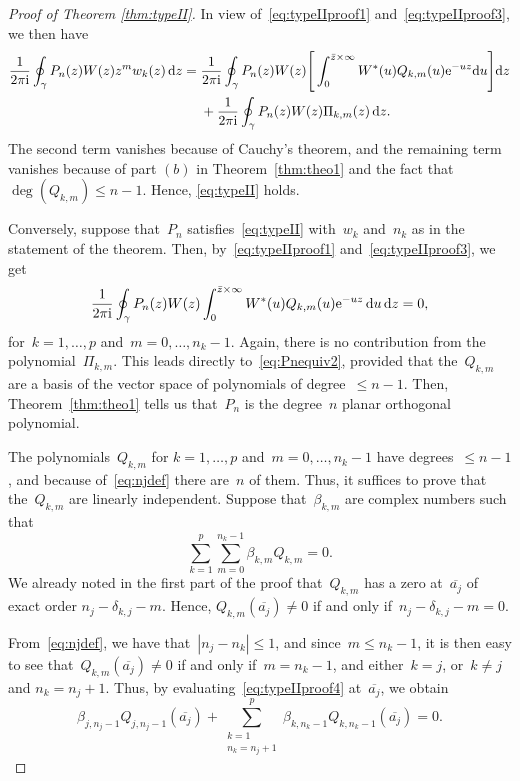 \documentclass[pdftex]{sigma}
\numberwithin{equation}{section}
\begin{document}
\begin{proof}[Proof of Theorem \ref{thm:typeII}]
 In view of~\eqref{eq:typeIIproof1} and~\eqref{eq:typeIIproof3}, we then have
 \begin{equation*}
 \begin{aligned}
 \frac{1}{2\pi {\rm i}} \oint_{\gamma} P_n(z) W(z) z^m w_k(z)\, {\rm d}z ={} &\frac{1}{2\pi {\rm i}} \oint_{\gamma} P_n(z) W(z) \Bigg[ \int_0^{\bar{z} \times \infty} W^*(u) Q_{k,m}(u) {\rm e}^{-uz} {\rm d}u\Bigg] {\rm d}z
 \\
 &{}+\frac{1}{2\pi {\rm i}} \oint_{\gamma} P_n(z) W(z)\Pi_{k,m}(z)\, {\rm d}z.
 \end{aligned}
 \end{equation*}
 The second term vanishes because of Cauchy's theorem, and the remaining term vanishes because of part $(b)$ in Theorem~\ref{thm:theo1} and the fact that~$\deg(Q_{k,m}) \leq n-1$. Hence, \eqref{eq:typeII} holds.

 Conversely, suppose that~$P_n$ satisfies~\eqref{eq:typeII} with~$w_k$ and~$n_k$ as in the statement of the theorem. Then, by~\eqref{eq:typeIIproof1} and~\eqref{eq:typeIIproof3}, we get
 \begin{equation*}
 \frac{1}{2\pi {\rm i}} \oint_{\gamma} P_n(z) W(z) \int_0^{\bar{z} \times \infty} W^*(u) Q_{k,m}(u) {\rm e}^{-uz}\, {\rm d}u\, {\rm d}z = 0,
 \end{equation*}
 for~$k=1, \dots, p$ and~$m = 0, \dots, n_k-1$. Again, there is no contribution from the polynomial~$\Pi_{k,m}$. This leads directly to~\eqref{eq:Pnequiv2}, provided that the~$Q_{k,m}$ are a basis of the vector space of polynomials of degree~$\leq n-1$. Then, Theorem~\ref{thm:theo1} tells us that~$P_n$ is the degree~$n$ planar orthogonal polynomial.

 The polynomials~$Q_{k,m}$ for $k=1, \dots, p$ and~$m=0, \dots, n_k-1$ have degrees~$\leq n-1$, and because of~\eqref{eq:njdef} there are~$n$ of them. Thus, it suffices to prove that the~$Q_{k,m}$ are linearly independent. Suppose that~$\beta_{k,m}$ are complex numbers such that
 \begin{equation}
 \label{eq:typeIIproof4}
 \sum_{k=1}^p \sum_{m=0}^{n_k-1} \beta_{k,m} Q_{k,m} = 0.
 \end{equation}
 We already noted in the first part of the proof that~$Q_{k,m}$ has a zero at~$\overline{a_j}$ of exact order $n_j-\delta_{k,j}-m$. Hence, $Q_{k,m}(\overline{a_j}) \neq 0$ if and only if~$n_j-\delta_{k,j}-m =0$.

 From~\eqref{eq:njdef}, we have that~$|n_j-n_k| \leq 1$, and since~$m \leq n_k-1$, it is then easy to see that~$Q_{k,m}(\overline{a_j}) \neq 0$ if and only if~$m = n_{k}-1$, and either~$k=j$, or~$k \neq j$ and $n_k = n_j+1$. Thus, by evaluating~\eqref{eq:typeIIproof4} at~$\overline{a_j}$, we obtain
 \begin{equation}
 \label{eq:typeIIproof5}
 \beta_{j,n_j-1} Q_{j,n_j-1}(\overline{a_j}) + \sum_{\substack{k=1\\ n_k = n_j+1}}^p \beta_{k,n_k-1} Q_{k,n_k-1}(\overline{a_j}) = 0.
 \end{equation}


\end{proof}
\end{document}
